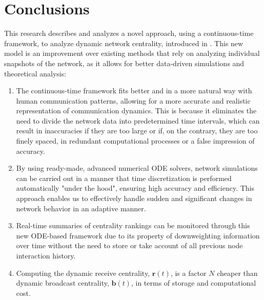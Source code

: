 
\chapter{Conclusions}
\label{chap:concl}

This research describes and analyzes a novel approach, using a continuous-time framework, to analyze dynamic network centrality, introduced in \cite{grindrod2014dynamical}. This new model is an improvement over existing methods that rely on analyzing individual snapshots of the network, as it allows for better data-driven simulations and theoretical analysis:

\begin{enumerate}[label=(\roman*)]
  \item The continuous-time framework fits better and in a more natural way with human communication patterns, allowing for a more accurate and realistic representation of communication dynamics. This is because it eliminates the need to divide the network data into predetermined time intervals, which can result in inaccuracies if they are too large or if, on the contrary, they are too finely spaced, in redundant computational processes or a false impression of accuracy.
  \item By using ready-made, advanced numerical ODE solvers, network simulations can be carried out in a manner that time discretization is performed automatically "under the hood", ensuring high accuracy and efficiency. This approach enables us to effectively handle sudden and significant changes in network behavior in an adaptive manner.
  \item Real-time summaries of centrality rankings can be monitored through this new ODE-based framework due to its property of downweighting information over time without the need to store or take account of all previous node interaction history.
  \item Computing the dynamic receive centrality, $\mathbf{r}(t)$, is a factor $N$ cheaper than dynamic broadcast centrality, $\mathbf{b}(t)$, in terms of storage and computational cost.
\end{enumerate}







